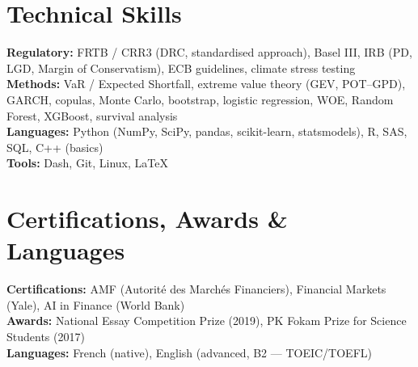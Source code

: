 \section{Technical Skills}
\begin{itemize}[leftmargin=0.15in, label={}]
  \small{\item{
    \textbf{Regulatory:} FRTB / CRR3 (DRC, standardised approach), Basel III, IRB (PD, LGD, Margin of Conservatism), ECB guidelines, climate stress testing \\
    \textbf{Methods:} VaR / Expected Shortfall, extreme value theory (GEV, POT--GPD), GARCH, copulas, Monte Carlo, bootstrap, logistic regression, WOE, Random Forest, XGBoost, survival analysis \\
    \textbf{Languages:} Python (NumPy, SciPy, pandas, scikit-learn, statsmodels), R, SAS, SQL, C++ (basics) \\
    \textbf{Tools:} Dash, Git, Linux, \LaTeX
  }}
\end{itemize}

\section{Certifications, Awards \& Languages}
\begin{itemize}[leftmargin=0.15in, label={}]
  \small{\item{
    \textbf{Certifications:} AMF (Autorit\'e des March\'es Financiers), Financial Markets (Yale), AI in Finance (World Bank) \\
    \textbf{Awards:} National Essay Competition Prize (2019), PK Fokam Prize for Science Students (2017) \\
    \textbf{Languages:} French (native), English (advanced, B2 --- TOEIC/TOEFL)
  }}
\end{itemize}


